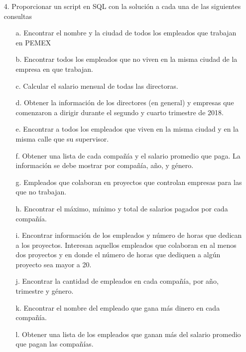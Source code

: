 \documentclass[12pt, letterpaper]{article}
\begin{document}
\begin{itemize}
		\item[4.] Proporcionar un script en SQL con la solución a cada una de las siguientes consultas
		
			\begin{itemize}
			    \item[a.] Encontrar el nombre y la ciudad de todos los empleados que trabajan en PEMEX
			
				\item[b.] Encontrar todos los empleados que no viven en la misma ciudad de la empresa en que
				trabajan.

				\item[c.] Calcular el salario mensual de todas las directoras.

				\item[d.] Obtener la información de los directores (en general) y empresas que comenzaron a dirigir
				durante el segundo y cuarto trimestre de 2018.

				
				\item[e.] Encontrar a todos los empleados que viven en la misma ciudad y en la misma calle que su
				supervisor.

			
				\item[f.] Obtener una lista de cada compañía y el salario promedio que paga. La información se debe
				mostrar por compañía, año, y género.


				\item[g.] Empleados que colaboran en proyectos que controlan empresas para las que no trabajan.


				\item[h.] Encontrar el máximo, mínimo y total de salarios pagados por cada compañía.


				\item[i.] Encontrar información de los empleados y número de horas que dedican a los proyectos.
				Interesan aquellos empleados que colaboran en al menos dos proyectos y en donde el
				número de horas que dediquen a algún proyecto sea mayor a 20.

				\item[j.] Encontrar la cantidad de empleados en cada compañía, por año, trimestre y género.


				\item[k.] Encontrar el nombre del empleado que gana más dinero en cada compañía.

				\item[l.] Obtener una lista de los empleados que ganan más del salario promedio que pagan las
				compañías.


\end{itemize}
\end{itemize}
\end{document}
